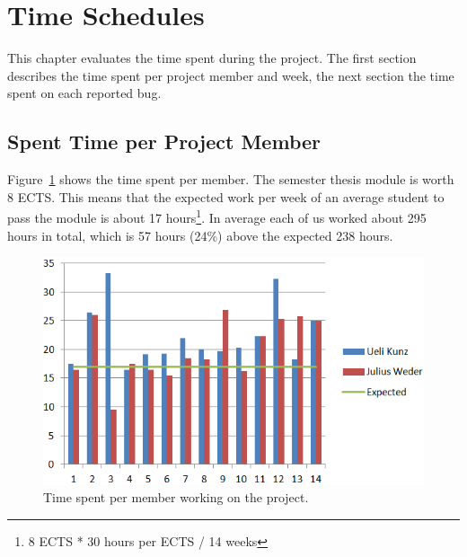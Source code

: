 \documentclass[11pt,a4paper,oneside]{scrreprt}
\begin{document}
\section{Time Schedules}
This chapter evaluates the time spent during the project. The first section describes the time spent per project member and week, the next section the time spent on each reported bug.

\subsection{Spent Time per Project Member}
Figure~\ref{fig:spenttime} shows the time spent per member. The semester thesis module is worth 8 ECTS. This means that the expected work per week of an average student to pass the module is about 17 hours\footnote{8 ECTS * 30 hours per ECTS / 14 weeks}. In average each of us worked about 295 hours in total, which is 57 hours (24\%) above the expected 238 hours.
\begin{figure}[h!tbp]
  \centering
\includegraphics[width=\textwidth]{figures/spenttime.png}
\caption{Time spent per member working on the project.}
\label{fig:spenttime}
\end{figure}
\end{document}
